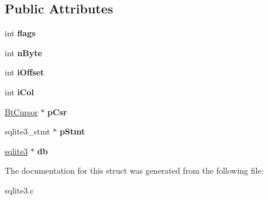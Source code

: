 \subsection*{Public Attributes}
\begin{DoxyCompactItemize}
\item 
\hypertarget{struct_incrblob_a46fa093e5241305f28d02926f8d0846f}{int {\bfseries flags}}\label{struct_incrblob_a46fa093e5241305f28d02926f8d0846f}

\item 
\hypertarget{struct_incrblob_ab1e1439df086208173fa97003f0ee02b}{int {\bfseries n\-Byte}}\label{struct_incrblob_ab1e1439df086208173fa97003f0ee02b}

\item 
\hypertarget{struct_incrblob_af8e71744f43178967460b9f402e7fafd}{int {\bfseries i\-Offset}}\label{struct_incrblob_af8e71744f43178967460b9f402e7fafd}

\item 
\hypertarget{struct_incrblob_a398a322b061fb9952bc155026976ba51}{int {\bfseries i\-Col}}\label{struct_incrblob_a398a322b061fb9952bc155026976ba51}

\item 
\hypertarget{struct_incrblob_af5a24b18473d1449c8c3fe7d826de59a}{\hyperlink{struct_bt_cursor}{Bt\-Cursor} $\ast$ {\bfseries p\-Csr}}\label{struct_incrblob_af5a24b18473d1449c8c3fe7d826de59a}

\item 
\hypertarget{struct_incrblob_a8b7b39c9372db552add74c69f14a61a3}{sqlite3\-\_\-stmt $\ast$ {\bfseries p\-Stmt}}\label{struct_incrblob_a8b7b39c9372db552add74c69f14a61a3}

\item 
\hypertarget{struct_incrblob_a9d3fe0b0229b75b9d0f9ee8e6545b5bc}{\hyperlink{structsqlite3}{sqlite3} $\ast$ {\bfseries db}}\label{struct_incrblob_a9d3fe0b0229b75b9d0f9ee8e6545b5bc}

\end{DoxyCompactItemize}


The documentation for this struct was generated from the following file\-:\begin{DoxyCompactItemize}
\item 
sqlite3.\-c\end{DoxyCompactItemize}
